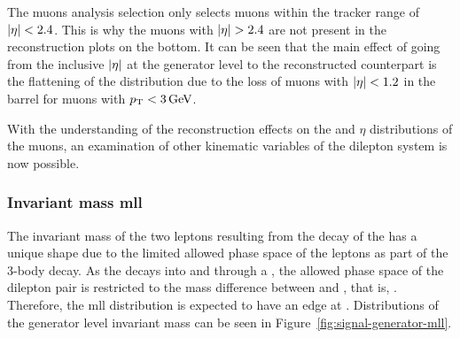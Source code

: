The muons analysis selection only selects muons within the tracker range of $\lvert \eta \rvert<2.4$. This is why the muons with $\lvert \eta \rvert>2.4$ are not present in the reconstruction plots on the bottom. It can be seen that the main effect of going from the inclusive $\lvert \eta \rvert$ at the generator level to the reconstructed counterpart is the flattening of the distribution due to the loss of muons with $\lvert \eta \rvert<1.2$ in the barrel for muons with $p_{\mathrm{T}}<3\,\text{Ge\hspace{-.08em}V}$.

With the understanding of the reconstruction effects on the \pt and $\eta$ distributions of the muons, an examination of other kinematic variables of the dilepton system is now possible.

\clearpage

\subsubsection{Invariant mass \gls{mll}}
\label{sec:gen-invariant-mass}

The invariant mass of the two leptons resulting from the decay of the \neutt has a unique shape due to the limited allowed phase space of the leptons as part of the 3-body decay. As the \neutt decays into \neuto and \ellell through a \PZstar, the allowed phase space of the dilepton pair is restricted to the mass difference between \neutt and \neuto, that is, \dm. Therefore, the \gls{mll} distribution is expected to have an edge at \dm. Distributions of the generator level invariant mass can be seen in Figure~\ref{fig:signal-generator-mll}.

